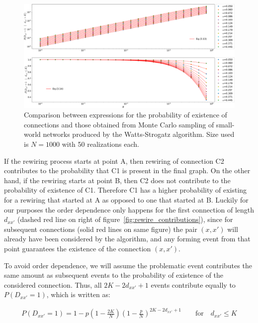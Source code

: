 \begin{figure}
    \centering
    \includegraphics[width=\linewidth]{fig/rewire_mc.png}
    \caption{Comparison between expressions for the probability of existence of connections and those obtained from Monte Carlo
    sampling of small-world networks produced by the Watts-Strogatz algorithm. Size used is $N=1000$ with 50 realizations each.}

    \label{fig:rewire_mc}
\end{figure}

If the rewiring process starts at point A, then rewiring of connection C2 contributes to the probability that C1 is present in the
final graph. On the other hand, if the rewiring starts at point B, then C2 does not contribute to the probability of existence of C1.
Therefore C1 has a higher probability of existing for a rewiring that started at A as opposed to one that started at B. Luckily for our
purposes the order dependence only happens for the first connection of length $d_{xx'}$ (dashed {\color{red}red} line on right of
figure~\ref{fig:rewire_contributions}), since for subsequent connections (solid {\color{red}red} lines on same figure) the pair
$(x,x')$ will already have been considered by the algorithm, and any forming event from that point guarantees the existence of the
connection $(x,x')$.

To avoid order dependence, we will assume the problematic event contributes the same amount as subsequent events to the probability of
existence of the considered connection. Thus, all $2K-2d_{xx'}+1$ events contribute equally to $P(D_{xx'}=1)$, which is written as:

\begin{align}
    P(D_{xx'}=1) = 1 - p\left(1-\frac{2K}{N}\right)\left(1-\frac{p}{N}\right)^{2K - 2d_{xx'} + 1} \qquad \text{for} \quad d_{xx'} \leq K
    \label{eq:probnear}
\end{align}

